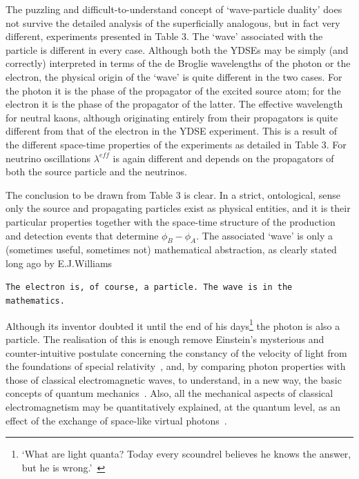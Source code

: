 \documentclass [12pt]{article}
\begin{document}
{  \par The puzzling and difficult-to-understand concept of `wave-particle duality' does not survive the detailed
  analysis of the superficially analogous, but in fact very different, experiments presented in Table 3.
   The `wave' associated
  with the particle is different in every case. Although both the YDSEs may be simply (and correctly) interpreted
  in terms of the de Broglie wavelengths of the photon or the electron, the physical origin of the `wave'
  is quite different in the two cases. For the photon it is the phase of the propagator of the excited
  source atom; for the electron it is the phase of the propagator of the latter. The effective
  wavelength for neutral kaons, although originating entirely from their propagators is quite 
  different from that of the electron in the YDSE experiment. This is a result of the different
 space-time properties of the experiments as detailed in Table 3. For neutrino oscillations
   $\lambda^{eff}$ is again different and depends on the propagators of both the source particle
  and the neutrinos. 
  \par The conclusion to be drawn from Table 3 is clear. In a strict, ontological, sense only the
   source and propagating particles exist as physical entities, and it is their particular
   properties together with the space-time structure of the production and detection events that determine
   $\phi_B-\phi_A$. The associated `wave' is only a (sometimes useful, sometimes not) mathematical
   abstraction, as clearly stated long ago by E.J.Williams~\cite{Williams}
   \par {\tt The electron is, of course, a particle. The wave is in the mathematics.}
    \par Although its inventor doubted it until the end of his days\footnote{`What are light quanta?
    Today every scoundrel believes he knows the answer, but he is wrong.'~\cite{EinBess}} the photon is 
    also a particle. The realisation of this is enough remove Einstein's mysterious and counter-intuitive postulate
    concerning the constancy of the velocity of light from the foundations of special relativity~\cite{JHF5},
    and, by comparing photon properties with those of classical electromagnetic waves, to understand,
    in a new way, the basic concepts of quantum mechanics~\cite{JHF6}. Also, all the mechanical aspects of
    classical electromagnetism may be quantitatively explained, at the quantum level, as an effect of
    the exchange of space-like virtual photons~\cite{JHF7}.

}
\end{document}

